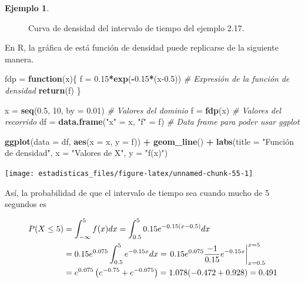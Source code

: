 \documentclass[
  11pt,
]{book}
\newenvironment{Shaded}{\begin{snugshade}}{\end{snugshade}}
\newcommand{\AttributeTok}[1]{\textcolor[rgb]{0.13,0.29,0.53}{#1}}
\newcommand{\CommentTok}[1]{\textcolor[rgb]{0.56,0.35,0.01}{\textit{#1}}}
\newcommand{\ControlFlowTok}[1]{\textcolor[rgb]{0.13,0.29,0.53}{\textbf{#1}}}
\newcommand{\DecValTok}[1]{\textcolor[rgb]{0.00,0.00,0.81}{#1}}
\newcommand{\FloatTok}[1]{\textcolor[rgb]{0.00,0.00,0.81}{#1}}
\newcommand{\FunctionTok}[1]{\textcolor[rgb]{0.13,0.29,0.53}{\textbf{#1}}}
\newcommand{\NormalTok}[1]{#1}
\newcommand{\OtherTok}[1]{\textcolor[rgb]{0.56,0.35,0.01}{#1}}
\newcommand{\SpecialCharTok}[1]{\textcolor[rgb]{0.81,0.36,0.00}{\textbf{#1}}}
\newcommand{\StringTok}[1]{\textcolor[rgb]{0.31,0.60,0.02}{#1}}
\theoremstyle{definition}
\theoremstyle{definition}
\newtheorem{example}{Ejemplo}[chapter]
\theoremstyle{definition}
\theoremstyle{definition}
\theoremstyle{remark}
\begin{document}
\begin{example}
\begin{figure}
{}

\caption{Curva de densidad del intervalo de tiempo del ejemplo 2.17.}\label{fig:ejemplo1}
\end{figure}

En R, la gráfica de está función de densidad puede replicarse de la siguiente manera.

\begin{Shaded}
\begin{Highlighting}[]
\NormalTok{fdp }\OtherTok{=} \ControlFlowTok{function}\NormalTok{(x)\{}
\NormalTok{  f }\OtherTok{=} \FloatTok{0.15}\SpecialCharTok{*}\FunctionTok{exp}\NormalTok{(}\SpecialCharTok{{-}}\FloatTok{0.15}\SpecialCharTok{*}\NormalTok{(x}\FloatTok{{-}0.5}\NormalTok{)) }\CommentTok{\# Expresión de la función de densidad}
  \FunctionTok{return}\NormalTok{(f)}
\NormalTok{\}}

\NormalTok{x }\OtherTok{=} \FunctionTok{seq}\NormalTok{(}\FloatTok{0.5}\NormalTok{, }\DecValTok{10}\NormalTok{, }\AttributeTok{by =} \FloatTok{0.01}\NormalTok{) }\CommentTok{\# Valores del dominio}
\NormalTok{f }\OtherTok{=} \FunctionTok{fdp}\NormalTok{(x) }\CommentTok{\# Valores del recorrido}
\NormalTok{df }\OtherTok{=} \FunctionTok{data.frame}\NormalTok{(}\StringTok{"x"} \OtherTok{=}\NormalTok{ x, }\StringTok{"f"} \OtherTok{=}\NormalTok{ f) }\CommentTok{\# Data frame para poder usar ggplot}

\FunctionTok{ggplot}\NormalTok{(}\AttributeTok{data =}\NormalTok{ df, }\FunctionTok{aes}\NormalTok{(}\AttributeTok{x =}\NormalTok{ x, }\AttributeTok{y =}\NormalTok{ f)) }\SpecialCharTok{+} \FunctionTok{geom\_line}\NormalTok{() }\SpecialCharTok{+} 
  \FunctionTok{labs}\NormalTok{(}\AttributeTok{title =} \StringTok{"Función de densidad"}\NormalTok{, }\AttributeTok{x =} \StringTok{"Valores de X"}\NormalTok{, }\AttributeTok{y =} \StringTok{"f(x)"}\NormalTok{)}
\end{Highlighting}
\end{Shaded}

\begin{center}\texttt{[image: estadisticas\_files/figure-latex/unnamed-chunk-55-1]} \end{center}

Así, la probabilidad de que el intervalo de tiempo sea cuando mucho de 5 segundos es

\begin{equation}
\notag
\begin{split}
P(X\leq 5) &= \int_{-\infty}^{5} f(x)dx = \int_{0.5}^{5} 0.15e^{-0.15(x-0.5)}dx\\
&= 0.15e^{0.075}\int_{0.5}^{5} e^{-0.15x}dx = \left. 0.15e^{0.075}\frac{-1}{0.15}e^{-0.15x}\right|_{x = 0.5}^{x = 5}\\
&= e^{0.075}\left(e^{-0.75} + e^{-0.075} \right) = 1.078(-0.472 + 0.928) = 0.491\\
\end{split}
\end{equation}


\end{example}
\end{document}
